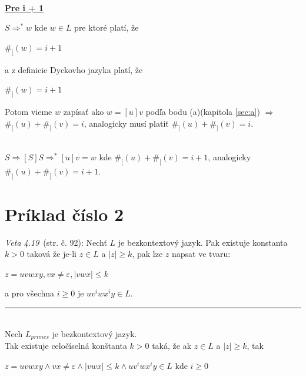 \documentclass[11pt,a4paper]{article}
\begin{document}
\hfill\\[-1em]

\underline{\textbf{Pre i + 1}}
\begin{flushright}
\begin{minipage}{0.95\textwidth}
    $S \Rightarrow^{*} w$ kde $w \in L$ pre ktoré platí, že
    \begin{center}
        $\#_{[}(w)=i+1$
    \end{center}
    a z definicie Dyckovho jazyka platí, že
    \begin{center}
        $\#_{]}(w)=i+1$
    \end{center}
    Potom vieme $w$ zapísať ako $w=[u]v$ podľa bodu (a)(kapitola \ref{sec:a}) $\Rightarrow$ $\#_{[}(u) + \#_{[}(v) = i$, analogicky musí platiť $\#_{]}(u) + \#_{]}(v) = i$.
\end{minipage}
\end{flushright}

\hfill\\[2em]

$S \Rightarrow [S]S \Rightarrow^{*} [u]v = w$ kde $\#_{[}(u) + \#_{[}(v) = i+1$, analogicky $\#_{]}(u) + \#_{]}(v) = i+1$.


\newpage
\section{Príklad číslo 2} %

\textit{Veta 4.19}~\cite{TIN}(str. č. 92): Nechť $L$ je bezkontextový jazyk. Pak existuje konstanta $k>0$ taková že je-li $z \in L$ a $|z| \geq k$, pak lze $z$ napsat ve tvaru:

\begin{center}
$z = uvwxy, vx \neq \varepsilon, |vwx| \leq k$
\end{center}

a pro všechna $i \geq 0$ je $uv^{i}wx^{i}y \in L$.

\rule{17cm}{0.4pt}

\hfill\\[-2em]

Nech $L_{primes}$ je bezkontextový jazyk.\\

Tak existuje celočíselná konštanta $k > 0$ taká, že ak $z \in L$ a $|z| \geq k$, tak

\begin{center}
$z = uvwxy \wedge vx \neq \varepsilon \wedge |vwx| \leq k \wedge uv^{i}wx^{i}y \in L$ kde $i \geq 0$\\
\end{center}
\end{document}
